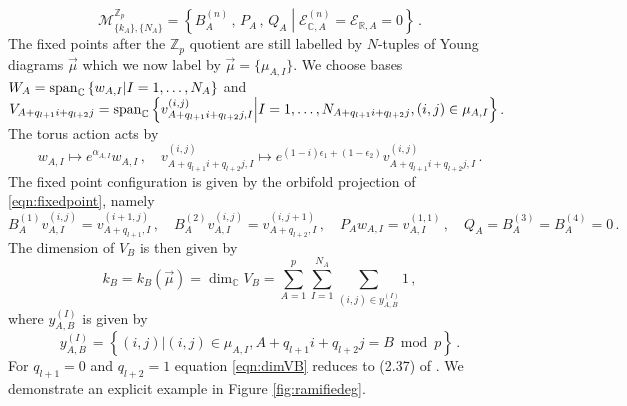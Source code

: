 \documentclass[main.tex]{subfiles}
\begin{document}
\begin{equation}
\mathcal{M}_{\{k_A\},\{N_A\}}^{\mathbb{Z}_p}=\left\{B^{(n)}_A\,,\,P_A\,,\,Q_A\middle|\mathcal{E}^{(n)}_{\mathbb{C},A}=\mathcal{E}_{\mathbb{R},A}=0\right\}\,.
\end{equation}
The fixed points after the $\mathbb{Z}_p$ quotient are still labelled by $N$-tuples of Young diagrams $\vec{\mu}$ which we now label by $\vec{\mu}=\{\mu_{A,I}\}$.
We choose bases $W_A=\operatorname{span}_{\mathbb{C}}\left\{w_{A,I}\middle|I=1,\dots,N_A\right\}$ and $V_{A+q_{l+1}i+q_{l+2}j}=\operatorname{span}_{\mathbb{C}}\left\{v^{(i,j)}_{A+q_{l+1}i+q_{l+2}j,I}\middle|I=1,\dots,N_{A+q_{l+1}i+q_{l+2}j}, (i,j)\in\mu_{A,I}\right\}$. The torus action acts by
\begin{equation}
w_{A,I}\mapsto e^{\alpha_{A,I}}w_{A,I}\,,\quad v^{(i,j)}_{A+q_{l+1}i+q_{l+2}j,I}\mapsto e^{(1-i)\epsilon_1+(1-\epsilon_2)}v^{(i,j)}_{A+q_{l+1}i+q_{l+2}j,I}\,.
\end{equation}
The fixed point configuration is given by the orbifold projection of \eqref{eqn:fixedpoint}, namely
\begin{equation}\label{eqn:fixedpointorb}
B^{(1)}_{A}v^{(i,j)}_{A,I}=v^{(i+1,j)}_{A+q_{l+1},I}\,,\quad B^{(2)}_{A}v^{(i,j)}_{A,I}=v^{(i,j+1)}_{A+q_{l+2},I}\,,\quad P_Aw_{A,I}=v^{(1,1)}_{A,I}\,,\quad Q_A=B^{(3)}_A=B^{(4)}_A=0\,.
\end{equation}
The dimension of $V_B$ is then given by
\begin{equation}\label{eqn:dimVB}
k_B=k_B(\vec{\mu})=\dim_{\mathbb{C}}V_B=\sum_{A=1}^p \sum_{I=1}^{N_A}\sum_{(i,j)\in y_{A,B}^{(I)}}1\,,
\end{equation}
where $y_{A,B}^{(I)}$ is given by
\begin{equation}
y^{(I)}_{A,B}=\left\{(i,j)|(i,j)\in\mu_{A,I},A+q_{l+1}i+q_{l+2}j=B\bmod p\right\}\,.
\end{equation}
For $q_{l+1}=0$ and $q_{l+2}=1$ equation \eqref{eqn:dimVB} reduces to (2.37) of \cite{Kanno:2011fw}. We demonstrate an explicit example in Figure \ref{fig:ramifiedeg}.
\end{document}
